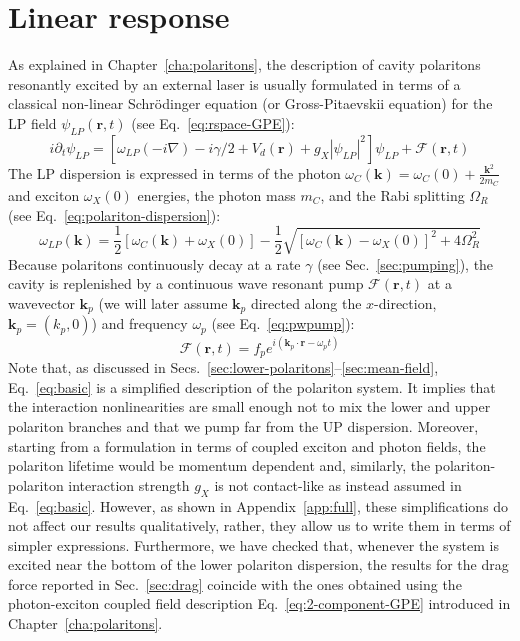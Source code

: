 \section{Linear response}
\label{sec:linea}

As explained in Chapter~\ref{cha:polaritons}, the description of
cavity polaritons resonantly excited by an external laser is usually
formulated in terms of a classical non-linear Schr\"odinger equation
(or Gross-Pitaevskii equation) for the LP field $\psi_{LP}(\bm{r}, t)$
(see Eq.~\eqref{eq:rspace-GPE}):
%
\begin{equation}
  i \partial_t \psi_{LP} = [\omega_{LP}(-i\nabla) - i\gamma/2 +
    V_d(\bm{r}) + g_X |\psi_{LP}|^2]\psi_{LP} + \mathcal{F}(\bm{r},t)
\label{eq:basic}
\end{equation}
%
The LP dispersion is expressed in terms of the photon
$\omega_C(\bm{k}) = \omega_C(0) + \frac{\bm{k}^2}{2m_C}$ and exciton
$\omega_X(0)$ energies, the photon mass $m_C$, and the Rabi splitting
$\Omega_R$ (see Eq.~\eqref{eq:polariton-dispersion}):
%
\begin{equation}
  \omega_{LP}(\bm{k}) = \frac{1}{2} \left[\omega_C(\bm{k}) +
    \omega_X(0)\right]  - \frac{1}{2} \sqrt{\left[\omega_C(\bm{k}) -
    \omega_X(0) \right]^2 + 4\Omega_R^2}
\label{eq:dispe}
\end{equation}
%
Because polaritons continuously decay at a rate $\gamma$ (see
Sec.~\ref{sec:pumping}), the cavity is replenished by a continuous
wave resonant pump $\mathcal{F}(\bm{r},t)$ at a wavevector $\bm{k}_p$ (we will
later assume $\bm{k}_p$ directed along the $x$-direction,
$\bm{k}_p = (k_p,0)$) and frequency $\omega_p$ (see
Eq.~\eqref{eq:pwpump}):
\begin{equation}
  \mathcal{F}(\bm{r},t) = f_p e^{i (\bm{k}_p \cdot \bm{r} -
    \omega_p t)}
\end{equation}
%
Note that, as discussed in
Secs.~\ref{sec:lower-polaritons}--\ref{sec:mean-field},
Eq.~\eqref{eq:basic} is a simplified description of the polariton
system. It implies that the interaction nonlinearities are small
enough not to mix the lower and upper polariton branches and that we
pump far from the UP dispersion. Moreover, starting from a formulation
in terms of coupled exciton and photon fields, the polariton lifetime
would be momentum dependent and, similarly, the polariton-polariton
interaction strength $g_X$ is not contact-like as instead assumed in
Eq.~\eqref{eq:basic}. However, as shown in Appendix~\ref{app:full},
these simplifications do not affect our results qualitatively, rather,
they allow us to write them in terms of simpler
expressions. Furthermore, we have checked that, whenever the system is
excited near the bottom of the lower polariton dispersion, the results
for the drag force reported in Sec.~\ref{sec:drag} coincide with the
ones obtained using the photon-exciton coupled field description
Eq.~\eqref{eq:2-component-GPE} introduced in
Chapter~\ref{cha:polaritons}.

